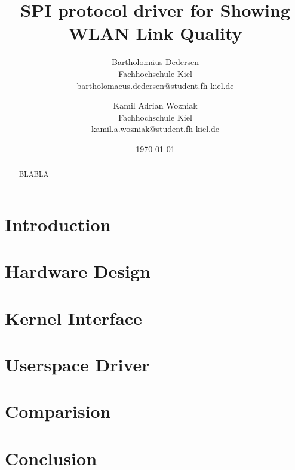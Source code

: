 \documentclass[bibtotocnumbered, headsepline,normalheadings]{report}
\begin{document}
\author{ 
Bartholomäus Dedersen \\ Fachhochschule Kiel \\ bartholomaeus.dedersen@student.fh-kiel.de \and
Kamil Adrian Wozniak \\ Fachhochschule Kiel \\ kamil.a.wozniak@student.fh-kiel.de}

\date{\today} 
\title{SPI protocol driver for Showing WLAN Link Quality} 

\maketitle


\begin{abstract}

    BLABLA

\end{abstract}

\tableofcontents \newpage

\chapter{Introduction}



\chapter{Hardware Design}
\label{chap:hardware}



\chapter{Kernel Interface}
\label{chap:kernel}


\chapter{Userspace Driver}
\label{chap:userspace}


\chapter{Comparision}
\label{chap:comparision}


\chapter{Conclusion}
\label{chap:conclusion}



\nocite{*}


\listoffigures
\begingroup \let\clearpage\relax
\listoftables \endgroup

\end{document}
